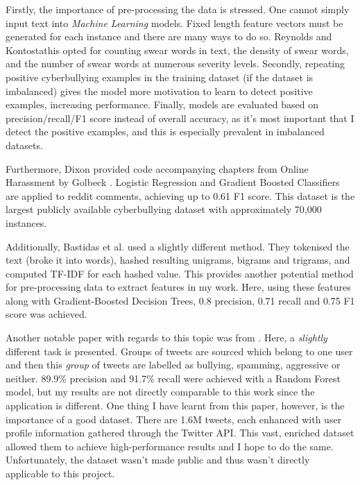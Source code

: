 \documentclass[12pt,a4paper]{article}
\begin{document}
Firstly, the importance of pre-processing the data is stressed. One cannot simply input text into \textit{Machine Learning} models. Fixed length feature vectors must be generated for each instance and there are many ways to do so. Reynolds and Kontostathis opted for counting swear words in text, the density of swear words, and the number of swear words at numerous severity levels.  Secondly, repeating positive cyberbullying examples in the training dataset (if the dataset is imbalanced) gives the model more motivation to learn to detect positive examples, increasing performance. Finally, models are evaluated based on precision/recall/F1 score instead of overall accuracy, as it's most important that I detect the positive examples, and this is especially prevalent in imbalanced datasets.

Furthermore, Dixon \citeyear{Dixon} provided code accompanying chapters from Online Harassment by Golbeck \citeyear{Golbeck}. Logistic Regression and Gradient Boosted Classifiers are applied to reddit comments, achieving up to 0.61 F1 score. This dataset is the largest publicly available cyberbullying dataset with approximately 70,000 instances. 

Additionally, Bastidas et al. \citeyear[p.2/3]{Hack} used a slightly different method. They tokenised the text (broke it into words), hashed resulting unigrams, bigrams and trigrams, and computed TF-IDF for each hashed value. This provides another potential method for pre-processing data to extract features in my work. Here, using these features along with Gradient-Boosted Decision Trees, 0.8 precision, 0.71 recall and 0.75 F1 score was achieved. 

Another notable paper with regards to this topic was from \cite{Birds}. Here, a \textit{slightly} different task is presented. Groups of tweets are sourced which belong to one user and then this \textit{group} of tweets are labelled as bullying, spamming, aggressive or neither. 89.9\% precision and 91.7\% recall were achieved with a Random Forest model, but my results are not directly comparable to this work since the application is different. One thing I have learnt from this paper, however, is the importance of a good dataset. There are 1.6M tweets, each enhanced with user profile information gathered through the Twitter API. This vast, enriched dataset allowed them to achieve high-performance results and I hope to do the same. Unfortunately, the dataset wasn't made public and thus wasn't directly applicable to this project.
\end{document}
